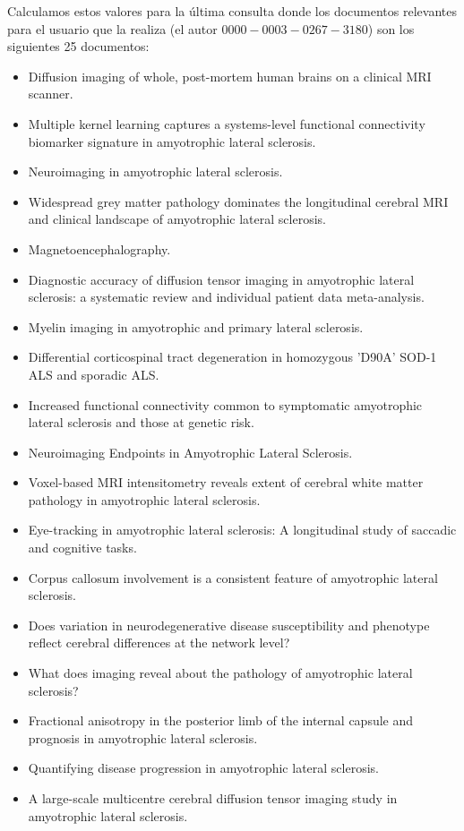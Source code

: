 \documentclass[size=a4, parskip=half, titlepage=false, toc=flat, toc=bib, 12pt, twoside]{scrartcl}
\theoremstyle{theorem-style}
\theoremstyle{definition-style}
\theoremstyle{remark-style}
\theoremstyle{example-style}
\theoremstyle{definition-style}
\theoremstyle{remark-style}
\begin{document}
Calculamos estos valores para la última consulta donde los documentos relevantes para el usuario que la realiza (el autor $0000-0003-0267-3180$) son los siguientes 25 documentos:
\begin{itemize}
\item Diffusion imaging of whole, post-mortem human brains on a clinical MRI scanner.
\item Multiple kernel learning captures a systems-level functional connectivity biomarker signature in amyotrophic lateral sclerosis.
\item Neuroimaging in amyotrophic lateral sclerosis.
\item Widespread grey matter pathology dominates the longitudinal cerebral MRI and clinical landscape of amyotrophic lateral sclerosis.
\item Magnetoencephalography.
\item Diagnostic accuracy of diffusion tensor imaging in amyotrophic lateral sclerosis: a systematic review and individual patient data meta-analysis.
\item Myelin imaging in amyotrophic and primary lateral sclerosis.
\item Differential corticospinal tract degeneration in homozygous 'D90A' SOD-1 ALS and sporadic ALS.
\item Increased functional connectivity common to symptomatic amyotrophic lateral sclerosis and those at genetic risk.
\item Neuroimaging Endpoints in Amyotrophic Lateral Sclerosis.
\item Voxel-based MRI intensitometry reveals extent of cerebral white matter pathology in amyotrophic lateral sclerosis.
\item Eye-tracking in amyotrophic lateral sclerosis: A longitudinal study of saccadic and cognitive tasks.
\item Corpus callosum involvement is a consistent feature of amyotrophic lateral sclerosis.
\item Does variation in neurodegenerative disease susceptibility and phenotype reflect cerebral differences at the network level?
\item What does imaging reveal about the pathology of amyotrophic lateral sclerosis?
\item Fractional anisotropy in the posterior limb of the internal capsule and prognosis in amyotrophic lateral sclerosis.
\item Quantifying disease progression in amyotrophic lateral sclerosis.
\item A large-scale multicentre cerebral diffusion tensor imaging study in amyotrophic lateral sclerosis.

\end{itemize}
\end{document}
